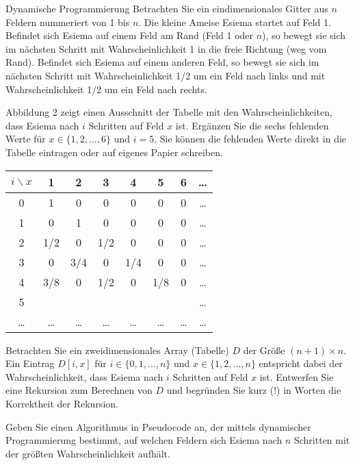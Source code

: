 \documentclass{article}
\begin{document}
\begin{eexercises}{Dynamische Programmierung}{
    Betrachten Sie ein eindimensionales Gitter aus $n$ Feldern nummeriert von 1 bis $n$. Die kleine Ameise Esiema startet auf Feld 1. Befindet sich Esiema auf einem Feld am Rand (Feld 1 oder $n$), so bewegt sie sich im nächsten Schritt mit Wahrscheinlichkeit 1 in die freie Richtung (weg vom Rand). Befindet sich Esiema auf einem anderen Feld, so bewegt sie sich im nächsten Schritt mit Wahrscheinlichkeit 1/2 um ein Feld nach links und mit Wahrscheinlichkeit 1/2 um ein Feld nach rechts.
  }
  \item Abbildung 2 zeigt einen Ausschnitt der Tabelle mit den Wahrscheinlichkeiten, dass Esiema nach $i$ Schritten auf Feld $x$ ist. Ergänzen Sie die sechs fehlenden Werte für $x \in \{1,2,\ldots,6\}$ und $i = 5$. Sie können die fehlenden Werte direkt in die Tabelle eintragen oder auf eigenes Papier schreiben.
  \begin{tabular}{c|cccc ccc}
    $i \backslash x$ & 1      & 2      & 3      & 4      & 5      & 6      & \ldots \\
    \hline
    0                & 1      & 0      & 0      & 0      & 0      & 0      & \ldots \\
    1                & 0      & 1      & 0      & 0      & 0      & 0      & \ldots \\
    2                & 1/2    & 0      & 1/2    & 0      & 0      & 0      & \ldots \\
    3                & 0      & 3/4    & 0      & 1/4    & 0      & 0      & \ldots \\
    4                & 3/8    & 0      & 1/2    & 0      & 1/8    & 0      & \ldots \\
    5                &        &        &        &        &        &        & \ldots \\
    \ldots           & \ldots & \ldots & \ldots & \ldots & \ldots & \ldots & \ldots \\
  \end{tabular}
  \item Betrachten Sie ein zweidimensionales Array (Tabelle) $D$ der Größe $(n + 1) \times n$. Ein Eintrag $D[i,x]$ für $i \in \{0,1,\ldots,n\}$ und $x \in \{1,2,\ldots,n\}$ entspricht dabei der Wahrscheinlichkeit, dass Esiema nach $i$ Schritten auf Feld $x$ ist. Entwerfen Sie eine Rekursion zum Berechnen von $D$ und begründen Sie kurz (!) in Worten die Korrektheit der Rekursion.
  \item Geben Sie einen Algorithmus in Pseudocode an, der mittels dynamischer Programmierung bestimmt, auf welchen Feldern sich Esiema nach $n$ Schritten mit der größten Wahrscheinlichkeit aufhält.
\end{eexercises}
\end{document}
